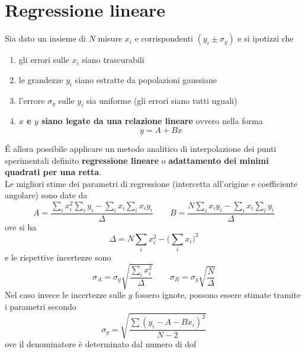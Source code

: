 \documentclass[10pt, oneside]{book}
\begin{document}
\section{Regressione lineare}
Sia dato un insieme di $N$ misure $x_i$ e corrispondenti $(y_i \pm \sigma_y)$ e si ipotizzi che
\begin{enumerate}
\item gli errori sulle $x_i$ siano trascurabili
\item le grandezze $y_i$ siano estratte da popolazioni gaussiane
\item l'errore $\sigma_y$ sulle $y_i$ sia uniforme (gli errori siano tutti uguali)
\item \textbf{$x$ e $y$ siano legate da una relazione lineare} ovvero nella forma
\[y = A + Bx\]
\end{enumerate}
\'E allora possibile applicare un metodo analitico di interpolazione dei punti sperimentali definito \textbf{regressione lineare} o \textbf{adattamento dei minimi quadrati per una retta}.\\Le migliori stime dei parametri di regressione (intercetta all'origine e coefficiente angolare) sono date da
\[A = \frac{\sum_i x_i^2 \sum_i y_i - \sum_i x_i \sum_i x_i y_i}{\Delta} \qquad B = \frac{N \sum_i x_i y_i - \sum_i x_i \sum_i y_i}{\Delta}\]
ove si ha
\[\Delta = N \sum_i x_i^2 - \bigg(\sum_i x_i\bigg)^{2}\]
e le rispettive incertezze sono
\[\sigma_A = \sigma_y \sqrt{\frac{\sum_i x_i^2}{\Delta}} \qquad \sigma_B = \sigma_y \sqrt{\frac{N}{\Delta}}\]
Nel caso invece le incertezze sulle $y$ fossero ignote, possono essere stimate tramite i parametri secondo
\[\sigma_y = \sqrt{\frac{\sum (y_i - A - B x_i)^2}{N-2}}\]
ove il denominatore è determinato dal numero di dof
\end{document}
